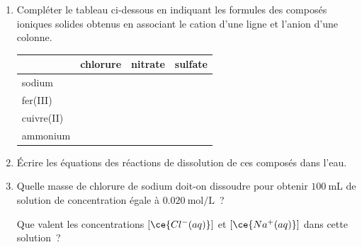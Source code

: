 \begin{enumerate}
    \item Compléter le tableau ci-dessous en indiquant les formules des composés
          ioniques solides obtenus en associant le cation d'une ligne et l'anion
          d'une colonne.

          \begin{minipage}{\linewidth}
              \begin{table}[H]
              \centering
              \renewcommand{\arraystretch}{1.5}
              \begin{tabularx}{\textwidth}{|p{3.5cm}|C|C|C|}
                   & chlorure  &
                  nitrate  & sulfate  \\
                  \hline
                  sodium  &  &  &  \\
                  \hline
                  fer(III)  &  &  &  \\
                  \hline
                  cuivre(II)  &  &  &  \\
                  \hline
                  ammonium  &  &  &  \\
                  \hline
              \end{tabularx}
          \end{table}
          \end{minipage}
          
    \item Écrire les équations des réactions de dissolution de ces composés dans
          l'eau.
    \item Quelle masse de chlorure de sodium doit-on dissoudre pour obtenir
          $\qty{100}{\mL}$ de solution de concentration égale à
          $\qty{0.020}{\mol\per\L}$~?
    
          Que valent les concentrations $[\ce{Cl^{-}(aq)}]$ et
          $[\ce{Na^{+}(aq)}]$ dans cette solution~?
\end{enumerate}

